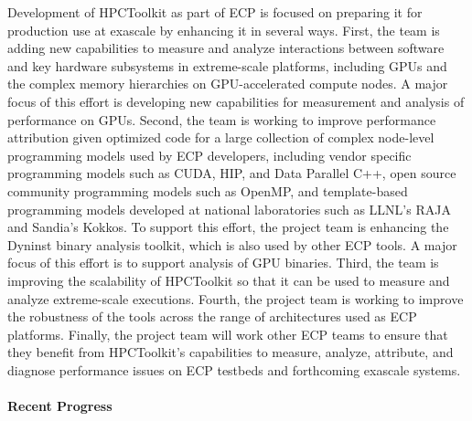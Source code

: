 Development of HPCToolkit as part of ECP is focused on preparing it
for production use at exascale by enhancing it in several ways. First,
the team is adding new capabilities to measure and analyze
interactions between software and key hardware subsystems in
extreme-scale platforms, including GPUs and the complex memory hierarchies on GPU-accelerated compute nodes. A major focus of this effort is developing new capabilities for 
measurement and analysis of performance on GPUs.
Second, the team is working to improve performance
attribution given optimized code for a large collection of complex node-level programming
models used by ECP developers, including 
vendor specific programming models such as CUDA, HIP, and Data Parallel C++,
open source community programming models such as OpenMP,
and template-based programming models developed at national laboratories such as LLNL's RAJA and Sandia's Kokkos. To support
this effort, the project team is enhancing the Dyninst binary analysis
toolkit, which is also used by other ECP tools. A major focus of this effort 
is to support analysis of GPU binaries. Third, the team is
improving the scalability of HPCToolkit so that it can be used to
measure and analyze extreme-scale executions. Fourth, the project team
is working to improve the robustness of the tools across the range of
architectures used as ECP platforms. Finally, the project team will
work other ECP teams to ensure that they benefit from HPCToolkit's
capabilities to measure, analyze, attribute, and diagnose performance
issues on ECP testbeds and forthcoming exascale systems.

\paragraph{Recent Progress}


